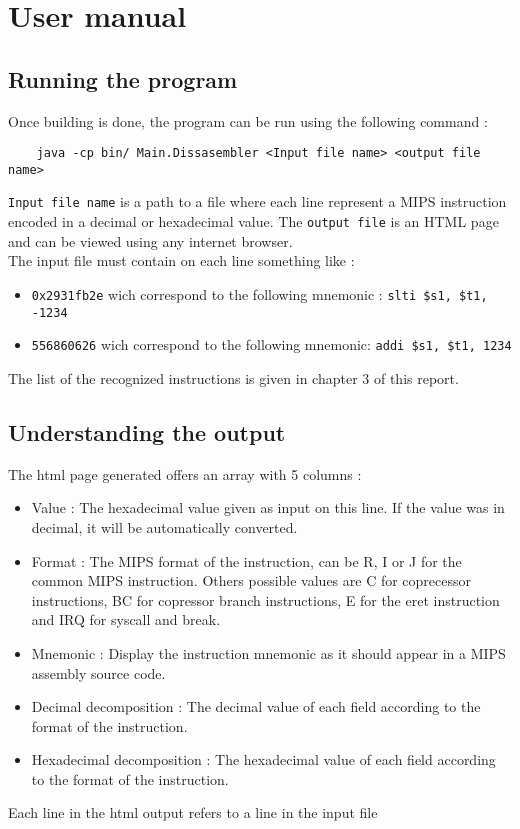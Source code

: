 \section{User manual}

\subsection{Running the program}

Once building is done, the program can be run using the following command :
\begin{verbatim}
	java -cp bin/ Main.Dissasembler <Input file name> <output file name>
\end{verbatim} 
\verb?Input file name? is a path to a file where each line represent a MIPS instruction encoded in a decimal or hexadecimal value. The \verb?output file? is an HTML page and can be viewed using any internet browser. \\
The input file must contain on each line something like : 
\begin{itemize} 
\item \verb?0x2931fb2e? wich correspond to the following mnemonic : \verb?slti $s1, $t1, -1234?
\item \verb?556860626? wich correspond to the following mnemonic: \verb?addi $s1, $t1, 1234?
\end{itemize}
The list of the recognized instructions is given in chapter 3 of this report. 

\subsection{Understanding the output}

The html page generated offers an array with 5 columns : 
\begin{itemize}
\item Value : The hexadecimal value given as input on this line. If the value was in decimal, it will be automatically converted. 
\item Format : The MIPS format of the instruction, can be R, I or J  for the common MIPS instruction. Others possible values are C for coprecessor instructions, BC for copressor branch instructions, E for the eret instruction and IRQ for syscall and break.  
\item Mnemonic : Display the instruction mnemonic as it should appear in a MIPS assembly source code.  
\item Decimal decomposition : The decimal value of each field according to the format of the instruction.
\item Hexadecimal decomposition :  The hexadecimal value of each field according to the format of the instruction.
\end{itemize}

Each line in the html output refers to a line in the input file



